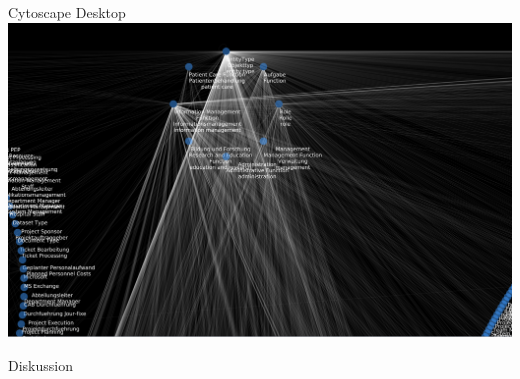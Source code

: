 \documentclass[14pt,aspectratio=1610]{beamer}
\begin{document}
\begin{frame}{Cytoscape Desktop}
\centering\includegraphics[width=\textwidth,height=\textheight,keepaspectratio]{img/types_classrelations_zoomed.png}
\end{frame}


\begin{frame}{Diskussion}
\end{frame}

\end{document}
